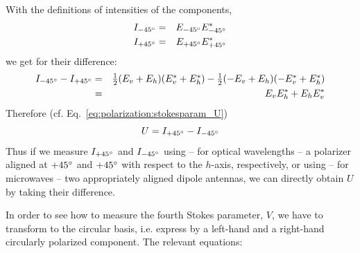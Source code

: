 %
With the definitions of intensities of the components,
\begin{eqnarray}
  \label{eq:polarization:Im45}
  I_{-45^\circ} &=& E_{-45^\circ} E_{-45^\circ}^\ast\\
  \label{eq:polarization:Ip45}
  I_{+45^\circ} &=& E_{+45^\circ} E_{+45^\circ}^\ast
\end{eqnarray}
we get for their difference:
\begin{eqnarray}
   I_{-45^\circ} -  I_{+45^\circ}
   &=&
     \textstyle\frac{1}{2} (E_v + E_h) (E_v^\ast + E_h^\ast)
    - \textstyle\frac{1}{2} (-E_v + E_h) (-E_v^\ast + E_h^\ast)\\ \nonumber
   &=&
   E_v E_h^\ast + E_h E_v^\ast
  \label{eq:polarization:Idiff_lin45base}
\end{eqnarray}
Therefore (cf. Eq.~\ref{eq:polarization:stokesparam_U})
\begin{equation}
  \label{eq:polarization:U_Idiff}
  U =   I_{+45^\circ} -  I_{-45^\circ}
\end{equation}
Thus if we measure $I_{+45^\circ}$ and $I_{-45^\circ}$ using -- for
optical wavelengths -- a polarizer aligned at $+45^\circ$ and
$+45^\circ$ with respect to the $h$-axis, respectively, or using --
for microwaves -- two appropriately aligned dipole antennas, we can
directly obtain $U$ by taking their difference.

In order to see how to measure the fourth Stokes parameter, $V$, we
have to transform to the circular basis, i.e. express  by a
left-hand and a right-hand circularly polarized component. The
relevant equations:

